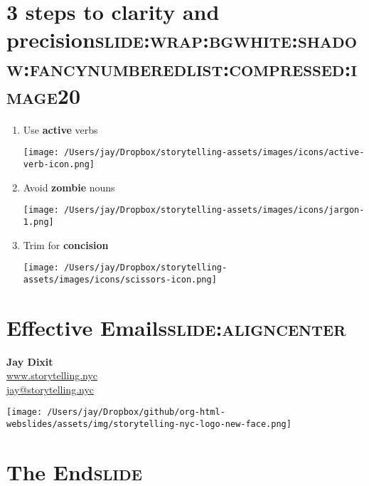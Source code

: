 \documentclass[12pt]{article}
\begin{document}
\section[3 steps to \textbf{clarity} and \textbf{precision}]{3 steps to \textbf{clarity} and \textbf{precision}\hfill{}\textsc{slide:wrap:bgwhite:shadow:fancynumberedlist:compressed:image20}}
\label{sec:org747ccaa}
\begin{enumerate}
\item Use \textbf{active} verbs \begin{center}
\texttt{[image: /Users/jay/Dropbox/storytelling-assets/images/icons/active-verb-icon.png]}
\end{center}
\item Avoid \textbf{zombie} nouns \begin{center}
\texttt{[image: /Users/jay/Dropbox/storytelling-assets/images/icons/jargon-1.png]}
\end{center}
\item Trim for \textbf{concision} \begin{center}
\texttt{[image: /Users/jay/Dropbox/storytelling-assets/images/icons/scissors-icon.png]}
\end{center}
\end{enumerate}


\section[Effective Emails]{Effective Emails\hfill{}\textsc{slide:aligncenter}}
\label{sec:org9146cf3}

\textbf{Jay Dixit} \\
\href{http://www.storytelling.nyc}{www.storytelling.nyc} \\
\href{mailto:jay@storytelling.nyc}{jay@storytelling.nyc} \\

\begin{center}
\texttt{[image: /Users/jay/Dropbox/github/org-html-webslides/assets/img/storytelling-nyc-logo-new-face.png]}
\end{center}

\section[The End]{The End\hfill{}\textsc{slide}}
\label{sec:orga3bf4b2}
\end{document}
